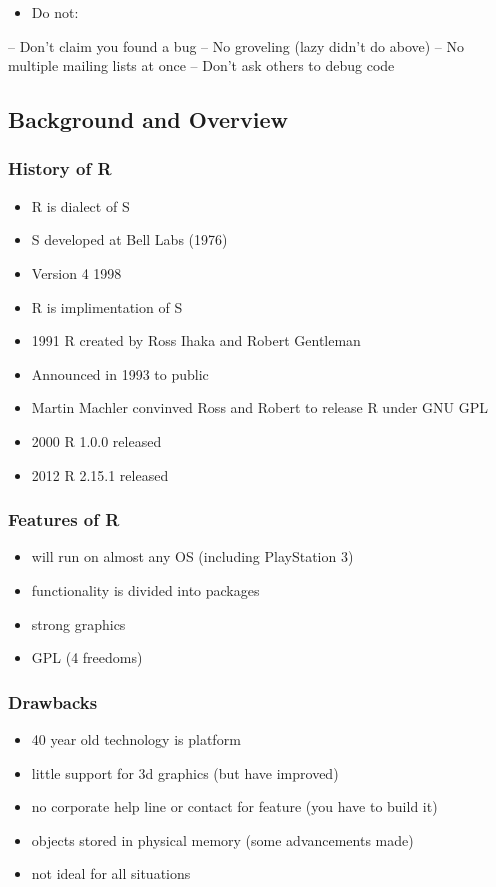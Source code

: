 \documentclass[11pt]{article}
\begin{document}
\begin{itemize}
\item Do not:
\end{itemize}
-- Don't claim you found a bug
-- No groveling (lazy didn't do above)
-- No multiple mailing lists at once
-- Don't ask others to debug code
\subsection{Background and Overview}
\label{sec-1-3}
\subsubsection{History of R}
\label{sec-1-3-1}

\begin{itemize}
\item R is dialect of S
\item S developed at Bell Labs (1976)
\item Version 4 1998
\item R is implimentation of S
\item 1991 R created by Ross Ihaka and Robert Gentleman
\item Announced in 1993 to public
\item Martin Machler convinved Ross and Robert to release R under GNU GPL
\item 2000 R 1.0.0 released
\item 2012 R 2.15.1 released
\end{itemize}
\subsubsection{Features of R}
\label{sec-1-3-2}

\begin{itemize}
\item will run on almost any OS (including PlayStation 3)
\item functionality is divided into packages
\item strong graphics
\item GPL (4 freedoms)
\end{itemize}
\subsubsection{Drawbacks}
\label{sec-1-3-3}

\begin{itemize}
\item 40 year old technology is platform
\item little support for 3d graphics (but have improved)
\item no corporate help line or contact for feature (you have to build it)
\item objects stored in physical memory (some advancements made)
\item not ideal for all situations
\end{itemize}
\end{document}
